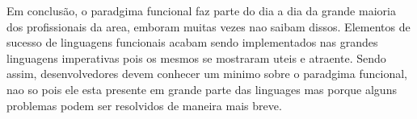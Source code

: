 Em conclusão, o paradgima funcional faz parte do dia a dia da grande maioria dos profissionais da area, emboram muitas vezes nao saibam dissos.
Elementos de sucesso de linguagens funcionais acabam sendo implementados nas grandes linguagens imperativas pois os mesmos se mostraram uteis e atraente.
Sendo assim, desenvolvedores devem conhecer um minimo sobre o paradgima funcional, nao so pois ele esta presente em grande parte das linguages mas porque alguns problemas podem ser resolvidos de maneira mais breve.
